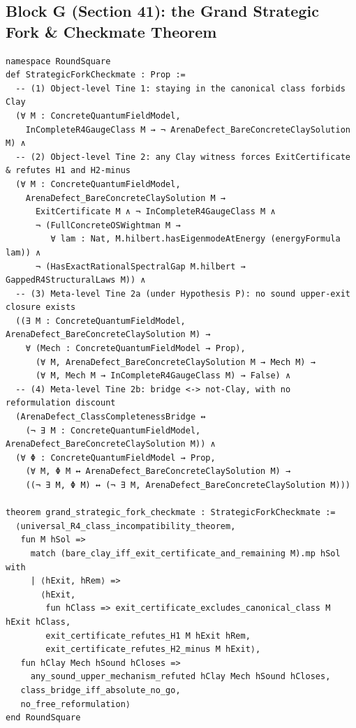 \documentclass[11pt,a4paper]{article}
\theoremstyle{plain}
\theoremstyle{definition}
\theoremstyle{remark}
\renewcommand{\_}{\oldunderscore\allowbreak}
\begin{document}
\subsection{Block G (Section 41): the Grand Strategic Fork \& Checkmate Theorem}
\begin{lstlisting}
namespace RoundSquare
def StrategicForkCheckmate : Prop :=
  -- (1) Object-level Tine 1: staying in the canonical class forbids Clay
  (∀ M : ConcreteQuantumFieldModel,
    InCompleteR4GaugeClass M → ¬ ArenaDefect_BareConcreteClaySolution M) ∧
  -- (2) Object-level Tine 2: any Clay witness forces ExitCertificate & refutes H1 and H2-minus
  (∀ M : ConcreteQuantumFieldModel,
    ArenaDefect_BareConcreteClaySolution M →
      ExitCertificate M ∧ ¬ InCompleteR4GaugeClass M ∧
      ¬ (FullConcreteOSWightman M →
         ∀ lam : Nat, M.hilbert.hasEigenmodeAtEnergy (energyFormula lam)) ∧
      ¬ (HasExactRationalSpectralGap M.hilbert → GappedR4StructuralLaws M)) ∧
  -- (3) Meta-level Tine 2a (under Hypothesis P): no sound upper-exit closure exists
  ((∃ M : ConcreteQuantumFieldModel, ArenaDefect_BareConcreteClaySolution M) →
    ∀ (Mech : ConcreteQuantumFieldModel → Prop),
      (∀ M, ArenaDefect_BareConcreteClaySolution M → Mech M) →
      (∀ M, Mech M → InCompleteR4GaugeClass M) → False) ∧
  -- (4) Meta-level Tine 2b: bridge <-> not-Clay, with no reformulation discount
  (ArenaDefect_ClassCompletenessBridge ↔
    (¬ ∃ M : ConcreteQuantumFieldModel, ArenaDefect_BareConcreteClaySolution M)) ∧
  (∀ Φ : ConcreteQuantumFieldModel → Prop,
    (∀ M, Φ M ↔ ArenaDefect_BareConcreteClaySolution M) →
    ((¬ ∃ M, Φ M) ↔ (¬ ∃ M, ArenaDefect_BareConcreteClaySolution M)))

theorem grand_strategic_fork_checkmate : StrategicForkCheckmate :=
  ⟨universal_R4_class_incompatibility_theorem,
   fun M hSol =>
     match (bare_clay_iff_exit_certificate_and_remaining M).mp hSol with
     | ⟨hExit, hRem⟩ =>
       ⟨hExit,
        fun hClass => exit_certificate_excludes_canonical_class M hExit hClass,
        exit_certificate_refutes_H1 M hExit hRem,
        exit_certificate_refutes_H2_minus M hExit⟩,
   fun hClay Mech hSound hCloses =>
     any_sound_upper_mechanism_refuted hClay Mech hSound hCloses,
   class_bridge_iff_absolute_no_go,
   no_free_reformulation⟩
end RoundSquare
\end{lstlisting}
\end{document}
